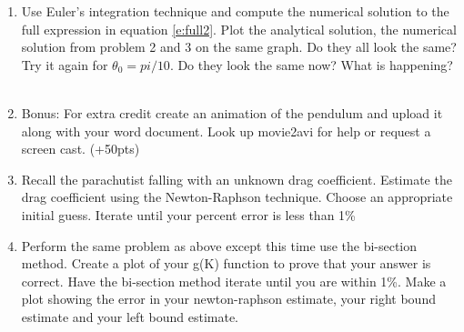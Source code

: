 \begin{enumerate}
\item Use Euler's integration technique and compute the
numerical solution to the full expression in equation
\ref{e:full2}. Plot the analytical solution, the numerical solution
from problem 2 and 3 on the same graph. Do they all look the same? Try
it again for $\theta_0=pi/10$. Do they look the same now? What is happening?
\ \\

\item Bonus: For extra credit create an animation of the pendulum and upload
it along with your word document. Look up movie2avi for help or
request a screen cast. (+50pts)

\item Recall the parachutist falling with an unknown drag
  coefficient. Estimate the drag coefficient using
  the Newton-Raphson technique. Choose an appropriate initial
  guess. Iterate until your percent error is less than 1\% 

\item Perform the same problem as above except this time use the
  bi-section method. Create a plot of your g(K) function to prove that
  your answer is correct. Have the bi-section method iterate until you
  are within 1\%. Make a plot showing the error in your newton-raphson
  estimate, your right bound estimate and your left bound estimate. 
  
\end{enumerate}
